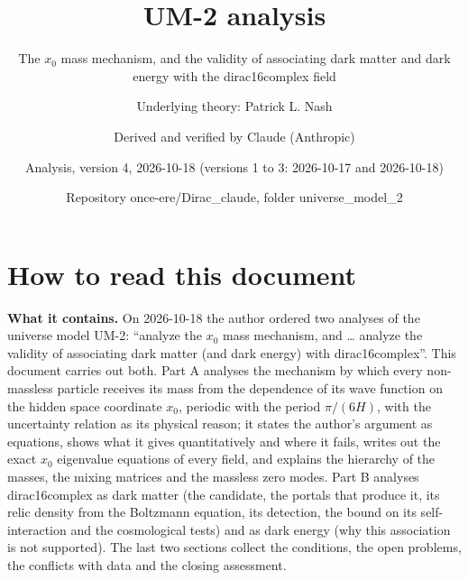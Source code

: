 \documentclass[
  10pt,
]{article}
\title{UM-2 analysis}
\subtitle{The \(x_0\) mass mechanism, and the validity of associating
dark matter and dark energy with the dirac16complex field}
\author{Underlying theory: Patrick L. Nash \and Derived and verified by
Claude (Anthropic) \and Analysis, version 4, 2026-10-18 (versions 1 to
3: 2026-10-17 and 2026-10-18) \and Repository once-ere/Dirac\_claude,
folder universe\_model\_2}
\date{}
\begin{document}
\maketitle

{
\hypersetup{linkcolor=}
\setcounter{tocdepth}{3}
\tableofcontents
}
\hypertarget{how-to-read-this-document}{%
\section*{How to read this document}\label{how-to-read-this-document}}

\textbf{What it contains.} On 2026-10-18 the author ordered two analyses
of the universe model UM-2: ``analyze the \(x_0\) mass mechanism, and
\ldots{} analyze the validity of associating dark matter (and dark
energy) with dirac16complex''. This document carries out both. Part A
analyses the mechanism by which every non-massless particle receives its
mass from the dependence of its wave function on the hidden space
coordinate \(x_0\), periodic with the period \(\pi/(6H)\), with the
uncertainty relation as its physical reason; it states the author's
argument as equations, shows what it gives quantitatively and where it
fails, writes out the exact \(x_0\) eigenvalue equations of every field,
and explains the hierarchy of the masses, the mixing matrices and the
massless zero modes. Part B analyses dirac16complex as dark matter (the
candidate, the portals that produce it, its relic density from the
Boltzmann equation, its detection, the bound on its self-interaction and
the cosmological tests) and as dark energy (why this association is not
supported). The last two sections collect the conditions, the open
problems, the conflicts with data and the closing assessment.
\end{document}
